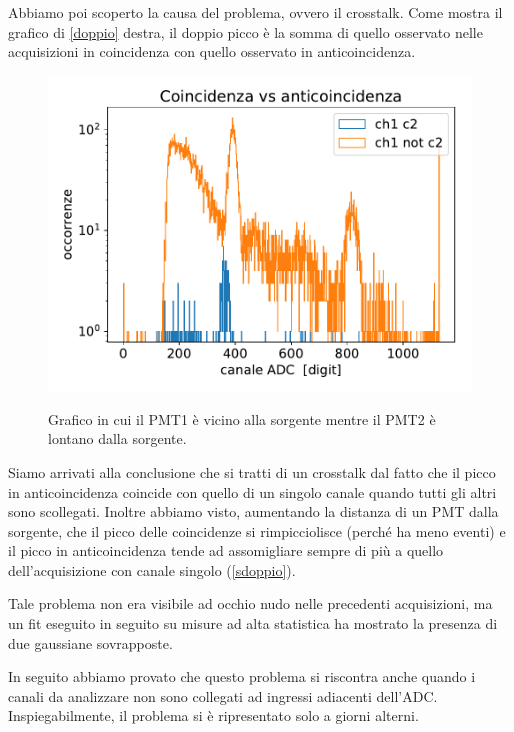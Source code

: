 Abbiamo poi scoperto la causa del problema, ovvero il crosstalk.
Come mostra il grafico di \autoref{doppio} destra, il doppio picco è la somma di quello osservato nelle acquisizioni in coincidenza con quello osservato in anticoincidenza. 



\begin{figure}[h]
\centering
\subfloat
{
\includegraphics[width=20 em]{immagini/dist}
}
\caption{Grafico in cui il PMT1 è vicino alla sorgente mentre il PMT2 è lontano dalla sorgente.}
\label{sdoppio}
\end{figure}

Siamo arrivati alla conclusione che si tratti di un crosstalk dal fatto che il picco in anticoincidenza coincide con quello di un singolo canale quando tutti gli altri sono scollegati.
Inoltre abbiamo visto, aumentando la distanza di un PMT dalla sorgente, che il picco delle coincidenze si rimpicciolisce (perché ha meno eventi) e il picco in anticoincidenza tende ad assomigliare sempre di più a quello dell'acquisizione con canale singolo (\autoref{sdoppio}).

Tale problema non era visibile ad occhio nudo nelle precedenti acquisizioni, ma un fit eseguito in seguito su misure ad alta statistica ha mostrato la presenza di due gaussiane sovrapposte.

In seguito abbiamo provato che questo problema si riscontra anche quando i canali da analizzare non sono collegati ad ingressi adiacenti dell'ADC. Inspiegabilmente, il problema si è ripresentato solo a giorni alterni. 
